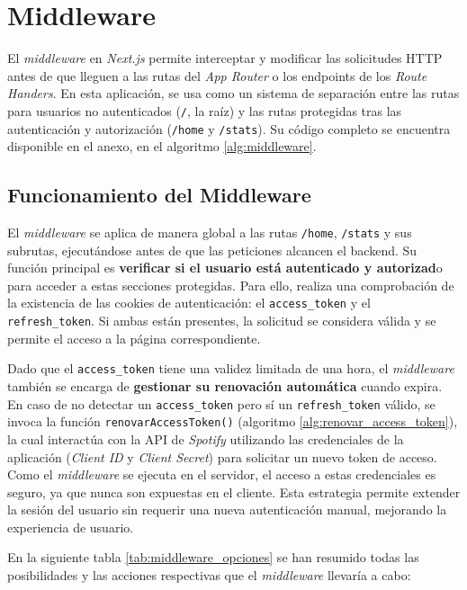 \section{Middleware}

El \textit{middleware} en \textit{Next.js} permite interceptar y modificar las solicitudes HTTP antes de que lleguen a las rutas del \textit{App Router} o los endpoints de los \textit{Route Handers}. En esta aplicación, se usa como un sistema de separación entre las rutas para usuarios no autenticados (\texttt{/}, la raíz) y las rutas protegidas tras las autenticación y autorización (\texttt{/home} y \texttt{/stats}). Su código completo se encuentra disponible en el anexo, en el algoritmo \ref{alg:middleware}.

\subsection{Funcionamiento del Middleware}

El \textit{middleware} se aplica de manera global a las rutas \texttt{/home}, \texttt{/stats} y sus subrutas, ejecutándose antes de que las peticiones alcancen el backend. Su función principal es \textbf{verificar si el usuario está autenticado y autorizad}o para acceder a estas secciones protegidas. Para ello, realiza una comprobación de la existencia de las cookies de autenticación: el \texttt{access\_token} y el \texttt{refresh\_token}. Si ambas están presentes, la solicitud se considera válida y se permite el acceso a la página correspondiente.

Dado que el \texttt{access\_token} tiene una validez limitada de una hora, el \textit{middleware} también se encarga de \textbf{gestionar su renovación automática} cuando expira. En caso de no detectar un \texttt{access\_token} pero sí un \texttt{refresh\_token} válido, se invoca la función \texttt{renovarAccessToken()} (algoritmo \ref{alg:renovar_access_token}), la cual interactúa con la API de \textit{Spotify} utilizando las credenciales de la aplicación (\textit{Client ID} y \textit{Client Secret}) para solicitar un nuevo token de acceso. Como el \textit{middleware} se ejecuta en el servidor, el acceso a estas credenciales es seguro, ya que nunca son expuestas en el cliente. Esta estrategia permite extender la sesión del usuario sin requerir una nueva autenticación manual, mejorando la experiencia de usuario.

En la siguiente tabla \ref{tab:middleware_opciones} se han resumido todas las posibilidades y las acciones respectivas que el \textit{middleware} llevaría a cabo:

